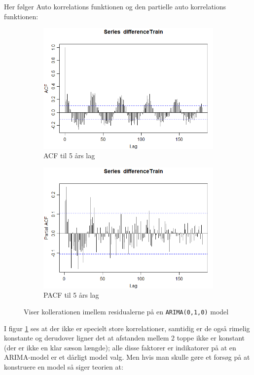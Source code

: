 Her følger Auto korrelations funktionen og den partielle auto korrelations funktionen:
\begin{figure}[H]
	\centering
	\begin{subfigure}[b]{0.49\textwidth}
		\includegraphics[width=\textwidth]{figures/acf}
		\caption{ACF til 5 års lag}
	\end{subfigure}
	\begin{subfigure}[b]{0.49\textwidth}
		\includegraphics[width=\textwidth]{figures/pacf}
		\caption{PACF til 5 års lag}
	\end{subfigure}
	\caption{Viser kollerationen imellem residualerne på en \texttt{ARIMA(0,1,0)} model}
	\label{fig:ts-acf-pacf}
\end{figure}

I figur \ref{fig:ts-acf-pacf} ses at der ikke er specielt store korrelationer,
samtidig er de også rimelig konstante og derudover ligner det at afstanden mellem 2 toppe ikke er konstant
(der er ikke en klar sæson længde); alle disse faktorer  er indikatorer på at en ARIMA-model er et dårligt model valg.
Men hvis man skulle gøre et forsøg på at konstruere en model så siger teorien \cite[s.~155]{time-series-analysis} at:

